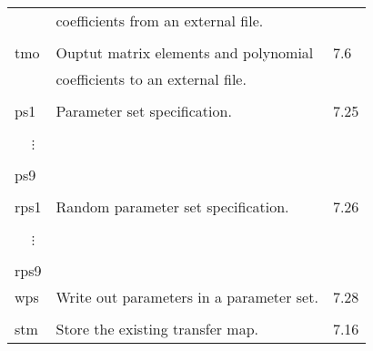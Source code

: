 \begin{center}
\begin{tabular}{lll}
                    & coefficients from an external file.          &\\
\vspace{-3mm}& &\\
\hspace{1.5em}tmo   &        Ouptut matrix elements and polynomial & \hspace{2em}7.6\\
                    & coefficients to an external file.            &\\
\vspace{-3mm}& &\\
\hspace{1.5em}ps1   &        Parameter set specification.          & \hspace{2em}7.25\\
\vspace{-7mm}& &\\
\hspace{1.5em}\ \ \,$\vdots$ & &\\
\vspace{-7mm}& &\\
\hspace{1.5em}ps9   & &\\
\vspace{-3mm}& &\\
\hspace{1.5em}rps1  &         Random parameter set specification.  & \hspace{2em}7.26\\
\vspace{-7mm}& &\\
\hspace{1.5em}\ \ \,$\vdots$ & &\\
\vspace{-7mm}& &\\
\hspace{1.5em}rps9  & &\\
\hspace{1.5em}wps   &    Write out parameters in a parameter set.  & \hspace{2em}7.28\\
\vspace{-3mm}& &\\
\hspace{1.5em}stm   &        Store the existing transfer map.      & \hspace{2em}7.16
\end{tabular}


\end{center}
